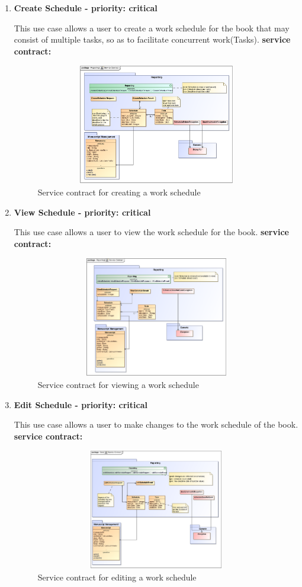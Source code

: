 \begin{enumerate}
\item \textbf{Create Schedule - priority: critical}
\par{This use case allows a user to create a work schedule for the book that may consist of multiple tasks, so as to facilitate concurrent work(Tasks).}
\textbf{service contract:} 
\begin{figure}[h]
\includegraphics[height=200px, width=500px]{epsImages/Reporting/createSchedule.eps}
\caption{Service contract for creating a work schedule}
\end{figure}
\newpage

\item \textbf{View Schedule - priority: critical}
\par{This use case allows a user to view the work schedule for the book.}
\textbf{service contract:}
\begin{figure}[h]
\includegraphics[height=200px, width=500px]{epsImages/Reporting/viewSchedule.eps}
\caption{Service contract for viewing a work schedule}
\end{figure}


\item \textbf{Edit Schedule - priority: critical}
\par{This use case allows a user to make changes to the work schedule of the book.}
\textbf{service contract:}

\begin{figure}[h]
\includegraphics[height=200px, width=500px]{epsImages/Reporting/editSchedule.eps}
\caption{Service contract for editing a work schedule}
\end{figure}
\newpage


\end{enumerate}
